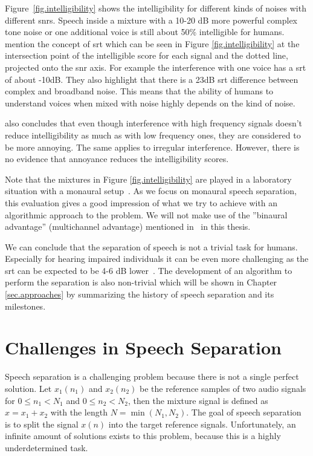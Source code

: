Figure~\ref{fig.intelligibility} shows the intelligibility for different kinds of noises with different \glspl{snr}. Speech inside a mixture with a 10-20 \si{\dB} more powerful complex tone noise or one additional voice is still about 50\% intelligible for humans.~\textcite{Wang2018b} mention the concept of \gls{srt} which can be seen in Figure \ref{fig.intelligibility} at the intersection point of the intelligible score for each signal and the dotted line, projected onto the \gls{snr} axis. For example the interference with one voice has a \gls{srt} of about -10\si{\dB}.
They also highlight that there is a 23\si{\dB} \gls{srt} difference between complex and broadband noise. This means that the ability of humans to understand voices when mixed with noise highly depends on the kind of noise.

\textcite{Miller1947} also concludes that even though interference with high frequency signals doesn't reduce intelligibility as much as with low frequency ones, they are considered to be more annoying. The same applies to irregular interference. However, there is no evidence that annoyance reduces the intelligibility scores.

Note that the mixtures in Figure \ref{fig.intelligibility} are played in a laboratory situation with a monaural setup~\cite{Miller1947}. As we focus on monaural speech separation, this evaluation gives a good impression of what we try to achieve with an algorithmic approach to the problem. We will not make use of the ''binaural advantage'' (multichannel advantage) mentioned in~\cite[p.~7]{Wang2006} in this thesis.

We can conclude that the separation of speech is not a trivial task for humans. Especially for hearing impaired individuals it can be even more challenging as the \gls{srt} can be expected to be 4-6 \si{\dB} lower~\cite{Festen1990}. The development of an algorithm to perform the separation is also non-trivial which will be shown in Chapter \ref{sec.approaches} by summarizing the history of speech separation and its milestones.

\section{Challenges in Speech Separation}\label{sec.challenges}
Speech separation is a challenging problem because there is not a single perfect solution.
Let $x_1(n_1)$ and $x_2(n_2)$ be the reference samples of two audio signals for $0 \le n_1 < N_1$ and $0 \le n_2 < N_2$, then the mixture signal is defined as $x = x_1 + x_2$ with the length $N = \min(N_1, N_2)$.
The goal of speech separation is to split the signal $x(n)$ into the target reference signals. Unfortunately, an infinite amount of solutions exists to this problem, because this is a highly underdetermined task.

